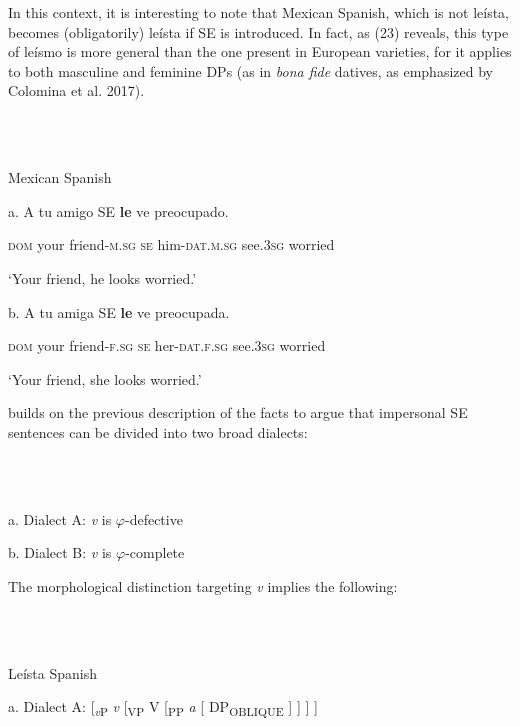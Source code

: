 \documentclass[output=paper]{langsci/langscibook}
\begin{document}
In this context, it is interesting to note that Mexican Spanish, which is not leísta, becomes (obligatorily) leísta if SE is introduced. In fact, as (23) reveals, this type of leísmo is more general than the one present in European varieties, for it applies to both masculine and feminine DPs (as in \textit{bona fide} datives, as emphasized by Colomina et al. 2017).

\ea%
    \label{ex:key:23}
    \gll\\
        \\
    \glt
    \z

          Mexican Spanish

a. A       tu      amigo         SE  \textbf{le} ve         preocupado.  

            \textsc{dom}   your friend\textsc{{}-m.}\textsc{sg} \textsc{se}   him\textsc{{}-dat.m.}\textsc{sg}  see\textsc{.3sg} worried

      ‘Your friend, he looks worried.’

  b. A       tu      amiga        SE  \textbf{le} ve          preocupada. 

            \textsc{dom}   your friend\textsc{{}-f.}\textsc{sg} \textsc{se}   her\textsc{{}-dat.f.}\textsc{sg} see\textsc{.3sg} worried

      ‘Your friend, she looks worried.’

\citet{Gallego2016} builds on the previous description of the facts to argue that impersonal SE sentences can be divided into two broad dialects:

\ea%
    \label{ex:key:24}
    \gll\\
        \\
    \glt
    \z

          a.   Dialect A: \textit{v} is $\varphi ${}-defective   

b.   Dialect B: \textit{v} is $\varphi ${}-complete 

The morphological distinction targeting \textit{v} implies the following:

\ea%
    \label{ex:key:25}
    \gll\\
        \\
    \glt
    \z

          Leísta Spanish

a.   Dialect A:   [\textit{\textsubscript{v}}\textsubscript{P} \textit{v} [\textsubscript{VP} V  [\textsubscript{PP} \textit{a}   [ DP\textsubscript{OBLIQUE} ] ] ] ]      

 
\end{document}
